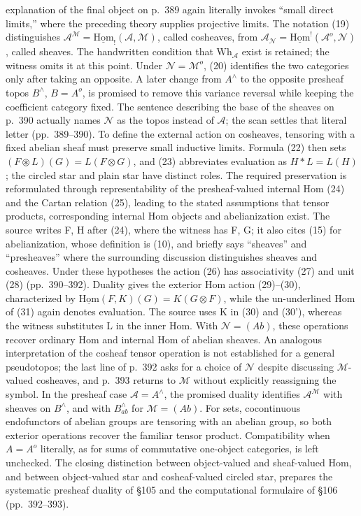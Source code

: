 \documentclass[10pt,oneside]{book}
\begin{document}
explanation of the final object on p.\ 389 again literally invokes ``small direct limits,'' where the preceding theory supplies projective limits. The notation (19) distinguishes $\mathcal A^{\mathcal M}=\underline{\mathrm{Hom}}_!(\mathcal A,\mathcal M)$, called cosheaves, from $\mathcal A_{\mathcal N}=\underline{\mathrm{Hom}}^!(\mathcal A^o,\mathcal N)$, called sheaves. The handwritten condition that $\mathrm{Wh}_{\mathcal A}$ exist is retained; the witness omits it at this point. Under $\mathcal N=\mathcal M^o$, (20) identifies the two categories only after taking an opposite. A later change from $A^\wedge$ to the opposite presheaf topos $B^\wedge$, $B=A^o$, is promised to remove this variance reversal while keeping the coefficient category fixed. The sentence describing the base of the sheaves on p.\ 390 actually names $\mathcal N$ as the topos instead of $\mathcal A$; the scan settles that literal letter (pp.\ 389--390). To define the external action on cosheaves, tensoring with a fixed abelian sheaf must preserve small inductive limits. Formula (22) then sets $(F\circledast L)(G)=L(F\otimes G)$, and (23) abbreviates evaluation as $H*L=L(H)$; the circled star and plain star have distinct roles. The required preservation is reformulated through representability of the presheaf-valued internal Hom (24) and the Cartan relation (25), leading to the stated assumptions that tensor products, corresponding internal Hom objects and abelianization exist. The source writes F, H after (24), where the witness has F, G; it also cites (15) for abelianization, whose definition is (10), and briefly says ``sheaves'' and ``presheaves'' where the surrounding discussion distinguishes sheaves and cosheaves. Under these hypotheses the action (26) has associativity (27) and unit (28) (pp.\ 390--392). Duality gives the exterior Hom action (29)--(30), characterized by $\underline{\mathrm{Hom}}(F,K)(G)=K(G\otimes F)$, while the un-underlined Hom of (31) again denotes evaluation. The source uses K in (30) and (30'), whereas the witness substitutes L in the inner Hom. With $\mathcal N=(Ab)$, these operations recover ordinary Hom and internal Hom of abelian sheaves. An analogous interpretation of the cosheaf tensor operation is not established for a general pseudotopos; the last line of p.\ 392 asks for a choice of $\mathcal N$ despite discussing $\mathcal M$-valued cosheaves, and p.\ 393 returns to $\mathcal M$ without explicitly reassigning the symbol. In the presheaf case $\mathcal A=A^\wedge$, the promised duality identifies $\mathcal A^{\mathcal M}$ with sheaves on $B^\wedge$, and with $B^\wedge_{ab}$ for $\mathcal M=(Ab)$. For sets, cocontinuous endofunctors of abelian groups are tensoring with an abelian group, so both exterior operations recover the familiar tensor product. Compatibility when $A=A^o$ literally, as for sums of commutative one-object categories, is left unchecked. The closing distinction between object-valued and sheaf-valued Hom, and between object-valued star and cosheaf-valued circled star, prepares the systematic presheaf duality of \S105 and the computational formulaire of \S106 (pp.\ 392--393).
\end{document}
